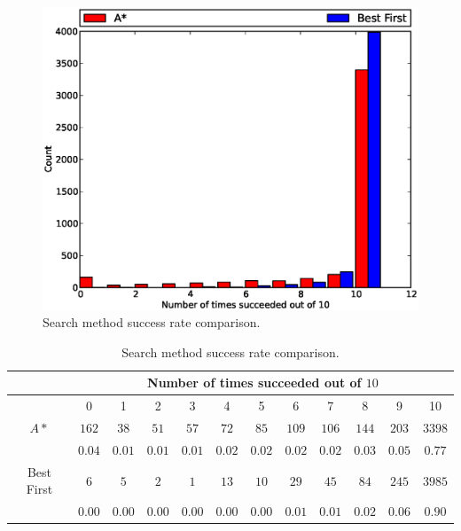 \begin{figure}[H]
\begin{center}
\includegraphics[width=\textwidth]{Images/search_success_comparison.eps}
\caption[Search method success rate comparison]{Search method success rate
comparison.}
\label{fig:search_success}
\end{center}
\end{figure}

\begin{table}[H]
\begin{center}
\begin{singlespace}
\begin{tabular}{|c||c|c|c|c|c|c|c|c|c|c|c|}
\hline
 & \multicolumn{11}{|c|}{Number of times succeeded out of $10$} \\
\hline
 & 0 & 1 & 2 & 3 & 4 & 5 & 6 & 7 & 8 & 9 & 10 \\
\hline\hline
$A*$ & $162$ & $38$ & $51$ & $57$ & $72$ & $85$ & $109$ & $106$ & $144$ & $203$ & $3398$ \\
 & $0.04$ & $0.01$ & $0.01$ & $0.01$ & $0.02$ & $0.02$ & $0.02$ & $0.02$ & $0.03$ & $0.05$ & $0.77$ \\
\hline
 Best First & $6$ & $5$ & $2$ & $1$ & $13$ & $10$ & $29$ & $45$ & $84$ & $245$ & $3985$ \\
  & $0.00$ & $0.00$ & $0.00$ & $0.00$ & $0.00$ & $0.00$ & $0.01$ & $0.01$ & $0.02$ & $0.06$ & $0.90$ \\
\hline
\end{tabular}
\end{singlespace}
\end{center}
\label{tb:search_success}
\caption[Search method success rate comparison]{Search method success rate
comparison.}
\end{table}

